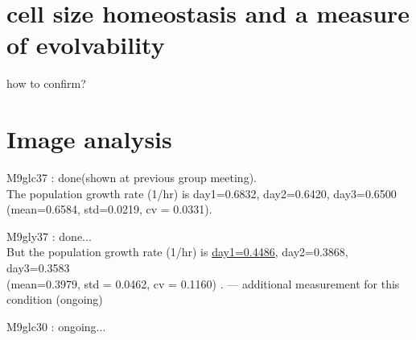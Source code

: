 \documentclass[10pt]{jsarticle}
\begin{document}
\section{cell size homeostasis and a measure of evolvability}
how to confirm?
\section{Image analysis}
M9glc37 : done(shown at previous group meeting).  \\ The population growth rate (1/hr) is  day1=0.6832, day2=0.6420, day3=0.6500\\ (mean=0.6584, std=0.0219, cv = 0.0331).

M9gly37 : done... \\ But the population growth rate (1/hr) is  \underline{day1=0.4486}, day2=0.3868, day3=0.3583\\ (mean=0.3979, std = 0.0462, cv = 0.1160)  . --- additional measurement for this condition (ongoing)

M9glc30 : ongoing...
\end{document}
